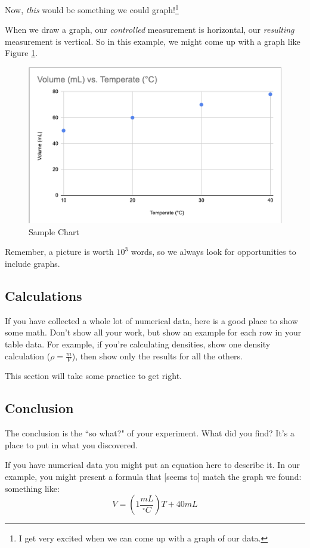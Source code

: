 \documentclass[12pt, oneside]{article}   	%
\begin{document}
Now, \emph{this} would be something we could graph!\footnote{I get very excited when we can come up with a graph of our data.}

When we draw a graph, our \emph{controlled} measurement is horizontal, our \emph{resulting} measurement is vertical.
So in this example, we might come up with a graph like Figure \ref{figure:sampleChart}.

\begin{figure}[p]
\includegraphics[scale=0.75]{Sample_Chem_Chart.png}
 \caption{Sample Chart}
 \label{figure:sampleChart}
 \end{figure}  

Remember, a picture is worth $10^3$ words, so we always look for opportunities to include graphs.


\subsection{Calculations}
If you have collected a whole lot of numerical data, here is a good place to show some math. Don't show all your work, but show an example for each row in your table data. For example, if you're calculating densities, show one density calculation ($\rho = \frac{m}{V}$), then show only the results for all the others.

This section will take some practice to get right.

\subsection{Conclusion}
The conclusion is the ``so what?" of your experiment. What did you find? It's a place to put in what you discovered.

If you have numerical data you might put an equation here to describe it. In our example, you might present a formula that [seems to] match the graph we found: something like:\\  $$ V = (1 \frac{mL}{^{\circ}C}) T + 40mL $$
\end{document}
